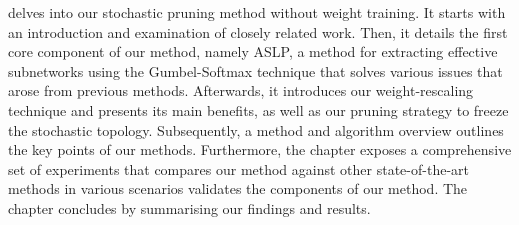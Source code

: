  delves into our stochastic pruning method without weight
training. It starts with an introduction and examination of closely related
work. Then, it details the first core component of our method, namely
\acl{ASLP}, a method for extracting effective subnetworks using the
Gumbel-Softmax technique that solves various issues that arose from previous
methods. Afterwards, it introduces our weight-rescaling technique and presents
its main benefits, as well as our pruning strategy to freeze the stochastic
topology. Subsequently, a method and algorithm overview outlines the key points
of our methods. Furthermore, the chapter exposes a comprehensive set of
experiments that compares our method against other state-of-the-art methods in
various scenarios \DIFdelbegin \DIFdel{, }\DIFdelend \DIFaddbegin {}\DIFaddend validates the components of our method. The chapter
concludes by summarising our findings and results.\\